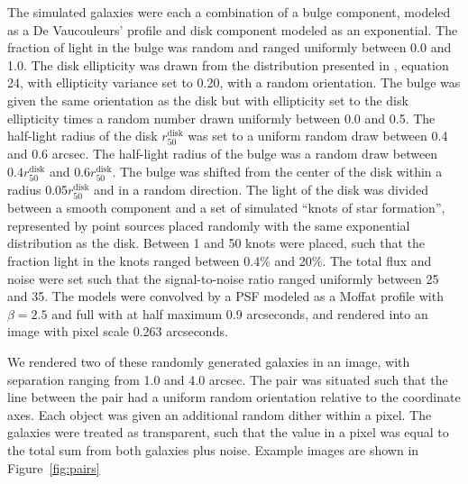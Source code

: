 \documentclass[iop, appendixfloats, numberedappendix, apj]{emulateapj}
\begin{document}
The simulated galaxies were each a combination of a bulge component, modeled as
a De Vaucouleurs' profile \citep{devauc1948} and disk component modeled as an
exponential. The fraction of light in the bulge was random and ranged uniformly
between 0.0 and 1.0. The disk ellipticity was drawn from the distribution
presented in \cite{ba14}, equation 24, with ellipticity variance set to 0.20,
with a random orientation. The bulge was given the same orientation as the disk
but with ellipticity set to the disk ellipticity times a random number drawn
uniformly between 0.0 and 0.5. The half-light radius of the disk
$r_{50}^{\mathrm{disk}}$ was set to a uniform random draw between 0.4 and 0.6
arcsec. The half-light radius of the bulge was a random draw between $0.4
r_{50}^{\mathrm{disk}}$ and $0.6 r_{50}^{\mathrm{disk}}$. The bulge was shifted
from the center of the disk within a radius 0.05$r_{50}^{\mathrm{disk}}$ and in
a random direction. The light of the disk was divided between a smooth
component and a set of simulated ``knots of star formation'', represented by
point sources placed randomly with the same exponential distribution as the
disk.  Between 1 and 50 knots were placed, such that the fraction light in the
knots ranged between 0.4\% and 20\%. The total flux and noise were set such
that the signal-to-noise ratio ranged uniformly between 25 and 35.  The models
were convolved by a PSF modeled as a Moffat profile with $\beta=2.5$ and full
with at half maximum 0.9 arcseconds, and rendered into an image with pixel
scale 0.263 arcseconds.

We rendered two of these randomly generated galaxies in an image, with
separation ranging from 1.0 and 4.0 arcsec. The pair was situated such that the
line between the pair had a uniform random orientation relative to the
coordinate axes. Each object was given an additional random dither within a
pixel. The galaxies were treated as transparent, such that the value in a pixel
was equal to the total sum from both galaxies plus noise. Example images are
shown in Figure~\ref{fig:pairs}
\end{document}
